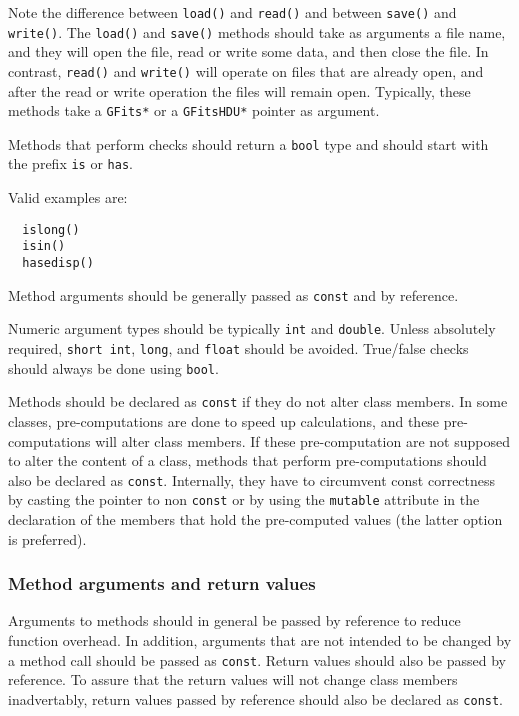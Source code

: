\documentclass{article}[12pt,a4]
\begin{document}
Note the difference between {\tt load()} and {\tt read()} and between {\tt save()} and {\tt write()}.
The {\tt load()} and {\tt save()} methods should take as arguments a file name, and they
will open the file, read or write some data, and then close the file.
In contrast, {\tt read()} and {\tt write()} will operate on files that are already open, and after
the read or write operation the files will remain open.
Typically, these methods take a {\tt GFits*} or a {\tt GFitsHDU*} pointer as argument.

Methods that perform checks should return a {\tt bool} type and should start with the
prefix {\tt is} or {\tt has}.

Valid examples are:
\begin{verbatim}
  islong()
  isin()
  hasedisp()
\end{verbatim}

Method arguments should be generally passed as {\tt const} and by reference.

Numeric argument types should be typically {\tt int} and {\tt double}.
Unless absolutely required, {\tt short int}, {\tt long}, and {\tt float} should be avoided.
True/false checks should always be done using {\tt bool}.

Methods should be declared as {\tt const} if they do not alter class members.
In some classes, pre-computations are done to speed up calculations, and these
pre-computations will alter class members.
If these pre-computation are not supposed to alter the content of a class,
methods that perform pre-computations should also be declared as {\tt const}.
Internally, they have to circumvent const correctness by casting the pointer to
non {\tt const} or by using the {\tt mutable} attribute in the declaration of the members
that hold the pre-computed values (the latter option is preferred).


\subsubsection{Method arguments and return values}

Arguments to methods should in general be passed by reference to reduce function
overhead.
In addition, arguments that are not intended to be changed by a method call should
be passed as {\tt const}.
Return values should also be passed by reference.
To assure that the return values will not change class members inadvertably, return
values passed by reference should also be declared as {\tt const}.
\end{document}
